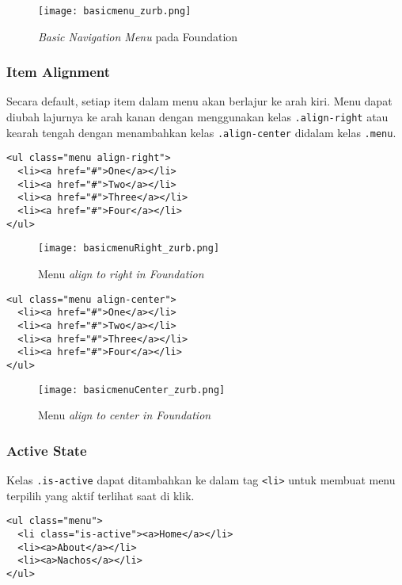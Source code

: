 \begin{figure} [H]  
    \centering  
	\texttt{[image: basicmenu\_zurb.png]}  
	\caption{\textit{Basic Navigation Menu} pada Foundation}
\end{figure}

\subsubsection{Item Alignment}
Secara default, setiap item dalam menu akan berlajur ke arah kiri. Menu dapat diubah lajurnya ke arah kanan dengan menggunakan kelas \texttt{.align-right} atau kearah tengah dengan menambahkan kelas \texttt{.align-center} didalam kelas \texttt{.menu}.
\begin{lstlisting}[frame=single] 
<ul class="menu align-right">
  <li><a href="#">One</a></li>
  <li><a href="#">Two</a></li>
  <li><a href="#">Three</a></li>
  <li><a href="#">Four</a></li>
</ul>
\end{lstlisting}

\begin{figure} [H]
	\centering  
	\texttt{[image: basicmenuRight\_zurb.png]}  
	\caption{Menu \textit{align to right in Foundation}}
\end{figure}

\begin{lstlisting}[frame=single] 
<ul class="menu align-center">
  <li><a href="#">One</a></li>
  <li><a href="#">Two</a></li>
  <li><a href="#">Three</a></li>
  <li><a href="#">Four</a></li>
</ul>
\end{lstlisting}

\begin{figure} [H]
	\centering  
	\texttt{[image: basicmenuCenter\_zurb.png]}  
	\caption{Menu \textit{align to center in Foundation}}
\end{figure}

\subsubsection{Active State}
Kelas \texttt{.is-active} dapat ditambahkan ke dalam tag \texttt{<li>} untuk membuat menu terpilih yang aktif terlihat saat di klik. 

\begin{lstlisting}[frame=single] 
<ul class="menu">
  <li class="is-active"><a>Home</a></li>
  <li><a>About</a></li>
  <li><a>Nachos</a></li>
</ul>
\end{lstlisting}

